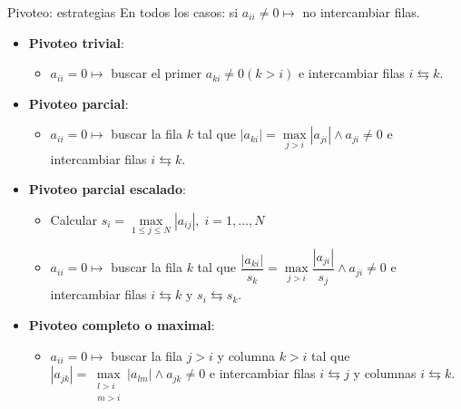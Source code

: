 \documentclass[9pt, aspectratio=169]{beamer}
\begin{document}
\begin{frame}{Pivoteo: estrategias}
	En todos los casos: si $a_{ii} \ne 0 \mapsto$ no intercambiar filas. \medskip

	\begin{itemize}
		\item \textbf{Pivoteo trivial}:
		      \begin{itemize}
			      \item $a_{ii} = 0 \mapsto$ buscar el primer $a_{ki} \ne 0 (k > i)$ e intercambiar filas $i \leftrightarrows k$.
		      \end{itemize} \medskip \pause

		\item \textbf{Pivoteo parcial}:
		      \begin{itemize}
			      \item $a_{ii} = 0 \mapsto$ buscar la fila $k$ tal que $|a_{ki}| = \max \limits_{j > i} |a_{ji}| \wedge a_{ji} \ne 0$ e intercambiar filas $i  \leftrightarrows k$.
		      \end{itemize}  \medskip \pause

		\item \textbf{Pivoteo parcial escalado}:
		      \begin{itemize}
			      \item Calcular $s_i = \max \limits_{1 \leq j \leq N} |a_{ij}|, \; i=1,\ldots,N$
			      \item $a_{ii} = 0 \mapsto$ buscar la fila $k$ tal que $\dfrac{|a_{ki}|}{s_k} = \max \limits_{j > i} \dfrac{|a_{ji}|}{s_j} \wedge a_{ji} \ne 0$ e intercambiar filas $i \leftrightarrows k$ y $s_i \leftrightarrows s_k$.
		      \end{itemize} \medskip \pause

		\item \textbf{Pivoteo completo o maximal}:
		      \begin{itemize}
			      \item $a_{ii} = 0 \mapsto$ buscar la fila $j>i$ y columna $k>i$ tal que $|a_{jk}| = \max \limits_{\substack{l > i \\ m > i}} |a_{lm}| \wedge a_{jk} \ne 0$ e intercambiar filas $i \leftrightarrows j$ y columnas $i \leftrightarrows k$.
		      \end{itemize}
	\end{itemize} \pause
	\begin{center}
		                                                                        \end{center}
\end{frame}
\end{document}
